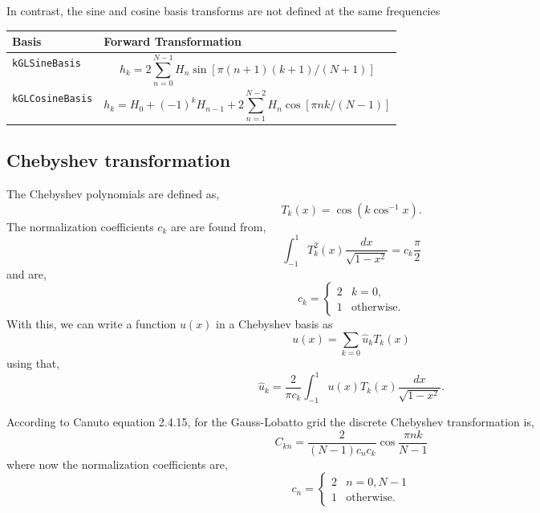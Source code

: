 \documentclass[11pt]{article}
\begin{document}
In contrast, the sine and cosine basis transforms are not defined at the same frequencies

\begin{tabular}{lL}
      \hline
      Basis & Forward Transformation \tabularnewline \hline \hline
      \verb"kGLSineBasis" & \[ h_k = 2 \sum_{n=0}^{N-1} H_n \sin \left[ \pi(n+1)(k+1)/(N+1)\right] \] \tabularnewline
      \verb"kGLCosineBasis" & \[ h_k = H_{0} + (-1)^{k} H_{n-1} +  2 \sum_{n=1}^{N-2} H_n \cos \left[ \pi n k/(N-1)\right] \] \tabularnewline
      \hline
\end{tabular}

\subsection{Chebyshev transformation}
The Chebyshev polynomials are defined as,
\begin{equation}
T_k(x) = \cos{ \left( k \cos^{-1}{x} \right)}.
\end{equation}
The normalization coefficients $c_k$ are are found from,
\begin{equation}
\int_{-1}^{1} T_k^2(x) \frac{dx}{\sqrt{1-x^2}} = c_k \frac{\pi}{2}
\end{equation}
and are,
\begin{equation}
c_k = \begin{cases}
    2  & k=0, \\
    1  & \text{otherwise}.
\end{cases}
\end{equation}
With this, we can write a function $u(x)$ in a Chebyshev basis as
\begin{equation}
u(x) = \sum_{k=0} \hat{u}_k T_k(x)
\end{equation}
using that,
\begin{equation}
\hat{u}_k = \frac{2}{\pi c_k} \int_{-1}^{1} u(x) T_k(x) \frac{dx}{\sqrt{1-x^2}}.
\end{equation}

According to Canuto equation 2.4.15, for the Gauss-Lobatto grid the discrete Chebyshev transformation is,
\begin{equation}
C_{kn} = \frac{2}{(N-1) c_n c_k} \cos \frac{\pi n k}{N-1}
\end{equation}
where now the normalization coefficients are,
\begin{equation}
c_n = \begin{cases}
    2  & n=0, N-1 \\
    1  & \text{otherwise}.
\end{cases}
\end{equation}
\end{document}
